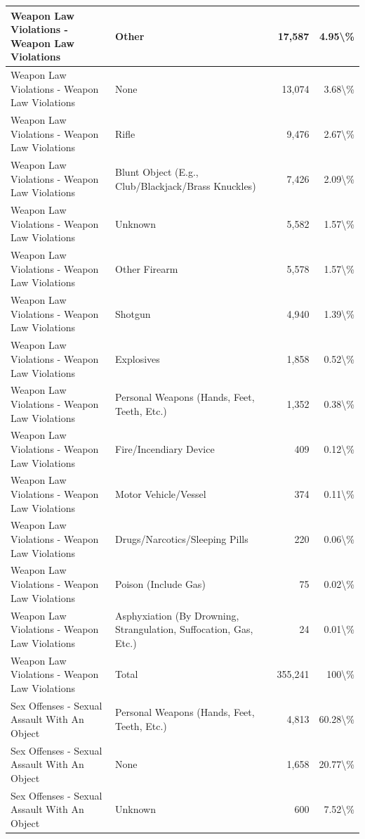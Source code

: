 \documentclass[
]{krantz}
\begin{document}
\begin{longtable}[t]{l|l|r|r}
\hline
Weapon Law Violations - Weapon Law Violations & Other & 17,587 & 4.95\textbackslash{}\%\\
\hline
Weapon Law Violations - Weapon Law Violations & None & 13,074 & 3.68\textbackslash{}\%\\
\hline
Weapon Law Violations - Weapon Law Violations & Rifle & 9,476 & 2.67\textbackslash{}\%\\
\hline
Weapon Law Violations - Weapon Law Violations & Blunt Object (E.g., Club/Blackjack/Brass Knuckles) & 7,426 & 2.09\textbackslash{}\%\\
\hline
Weapon Law Violations - Weapon Law Violations & Unknown & 5,582 & 1.57\textbackslash{}\%\\
\hline
Weapon Law Violations - Weapon Law Violations & Other Firearm & 5,578 & 1.57\textbackslash{}\%\\
\hline
Weapon Law Violations - Weapon Law Violations & Shotgun & 4,940 & 1.39\textbackslash{}\%\\
\hline
Weapon Law Violations - Weapon Law Violations & Explosives & 1,858 & 0.52\textbackslash{}\%\\
\hline
Weapon Law Violations - Weapon Law Violations & Personal Weapons (Hands, Feet, Teeth, Etc.) & 1,352 & 0.38\textbackslash{}\%\\
\hline
Weapon Law Violations - Weapon Law Violations & Fire/Incendiary Device & 409 & 0.12\textbackslash{}\%\\
\hline
Weapon Law Violations - Weapon Law Violations & Motor Vehicle/Vessel & 374 & 0.11\textbackslash{}\%\\
\hline
Weapon Law Violations - Weapon Law Violations & Drugs/Narcotics/Sleeping Pills & 220 & 0.06\textbackslash{}\%\\
\hline
Weapon Law Violations - Weapon Law Violations & Poison (Include Gas) & 75 & 0.02\textbackslash{}\%\\
\hline
Weapon Law Violations - Weapon Law Violations & Asphyxiation (By Drowning, Strangulation, Suffocation, Gas, Etc.) & 24 & 0.01\textbackslash{}\%\\
\hline
Weapon Law Violations - Weapon Law Violations & Total & 355,241 & 100\textbackslash{}\%\\
\hline
Sex Offenses - Sexual Assault With An Object & Personal Weapons (Hands, Feet, Teeth, Etc.) & 4,813 & 60.28\textbackslash{}\%\\
\hline
Sex Offenses - Sexual Assault With An Object & None & 1,658 & 20.77\textbackslash{}\%\\
\hline
Sex Offenses - Sexual Assault With An Object & Unknown & 600 & 7.52\textbackslash{}\%\\

\end{longtable}
\end{document}
